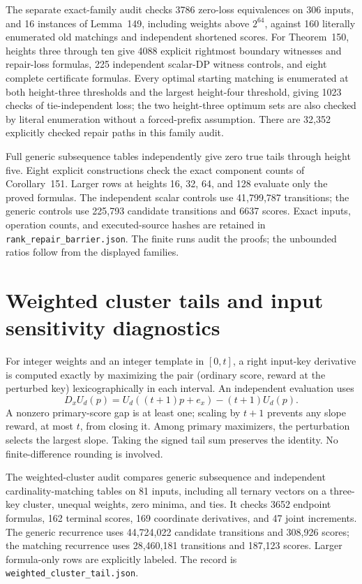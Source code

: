 \documentclass[11pt]{article}
\begin{document}
The separate exact-family audit checks 3786 zero-loss equivalences on
306 inputs, and 16 instances of Lemma~149,
including weights above $2^{64}$, against 160 literally enumerated old
matchings and independent shortened scores. For
Theorem~150, heights three through ten give
4088 explicit rightmost boundary witnesses and repair-loss formulas,
225 independent scalar-DP witness controls, and eight complete certificate
formulas. Every optimal starting matching is enumerated at both
height-three thresholds and the largest height-four threshold, giving
1023 checks of tie-independent loss; the two height-three optimum sets
are also checked by literal enumeration without a forced-prefix assumption.
There are 32,352 explicitly checked repair paths in this family audit.

Full generic subsequence tables independently give zero true tails
through height five. Eight explicit constructions check the exact
component counts of Corollary~151. Larger
rows at heights 16, 32, 64, and 128 evaluate only the proved formulas.
The independent scalar controls use 41,799,787 transitions; the generic
controls use 225,793 candidate transitions and 6637 scores. Exact inputs,
operation counts, and executed-source hashes are retained in
\texttt{rank\_repair\_barrier.json}. The finite runs audit the proofs;
the unbounded ratios follow from the displayed families.

\section{Weighted cluster tails and input sensitivity diagnostics}
\label{app:weighted-cluster-tail}
For integer weights and an integer template in $[0,t]$, a right input-key
derivative is computed exactly by maximizing the pair (ordinary score,
reward at the perturbed key) lexicographically in each interval. An
independent evaluation uses
\[
 D_xU_d(p)=U_d((t+1)p+e_x)-(t+1)U_d(p).
\]
A nonzero primary-score gap is at least one; scaling by $t+1$ prevents
any slope reward, at most $t$, from closing it. Among primary maximizers,
the perturbation selects the largest slope. Taking the signed tail sum
preserves the identity. No finite-difference rounding is involved.

The weighted-cluster audit compares generic subsequence and independent
cardinality-matching tables on 81 inputs, including all ternary vectors
on a three-key cluster, unequal weights, zero minima, and ties. It checks
3652 endpoint formulas, 162 terminal scores, 169 coordinate derivatives,
and 47 joint increments. The generic recurrence uses 44,724,022 candidate
transitions and 308,926 scores; the matching recurrence uses 28,460,181
transitions and 187,123 scores. Larger formula-only rows are explicitly
labeled. The record is \texttt{weighted\_cluster\_tail.json}.
\end{document}
